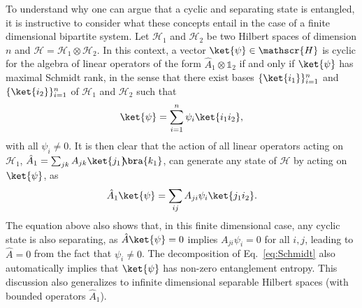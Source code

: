 \documentclass[letterpaper,12pt,titlepage,oneside,final]{book}
\newcommand{\openone}{\mathds{1}}
\begin{document}
To understand why one can argue that a cyclic and separating state is entangled, it is instructive to consider what these concepts entail in the case of a finite dimensional bipartite system. Let $\mathscr{H}_1$ and $\mathscr{H}_2$ be two Hilbert spaces of dimension $n$ and $\mathscr{H} = \mathscr{H}_1 \otimes \mathscr{H}_2$. In this context, a vector $\ket{\psi}\in\mathscr{H}$ is cyclic for the algebra of linear operators of the form $\hat{A}_1\otimes \openone_2$ if and only if $\ket{\psi}$ has maximal Schmidt rank, in the sense that there exist bases $\{\ket{i_1}\}_{i=1}^n$ and $\{\ket{i_2}\}_{i=1}^n$ of $\mathscr{H}_1$ and $\mathscr{H}_2$ such that
\begin{equation}\label{eq:Schmidt}
    \ket{\psi} = \sum_{i = 1}^n \psi_i\ket{i_1i_2},
\end{equation}
with all $\psi_i\neq0$. It is then clear that the action of all linear operators acting on $\mathscr{H}_1$, $\hat{A}_1 = \sum_{jk} A_{jk} \ket{j_1}\!\!\bra{k_1}$, can generate any state of $\mathscr{H}$ by acting on $\ket{\psi}$, as
\begin{equation}
    \hat{A}_1\ket{\psi} = \sum_{ij} A_{ji}\psi_i\ket{j_1i_2}.
\end{equation}
The equation above also shows that, in this finite dimensional case, any cyclic state is also separating, as $\hat{A}\ket{\psi} = 0$ implies $A_{ji}\psi_i = 0$ for all $i,j$, leading to $\hat{A} = 0$ from the fact that $\psi_i\neq 0$. The decomposition of Eq.~\eqref{eq:Schmidt} also automatically implies that $\ket{\psi}$ has non-zero entanglement entropy. This discussion also generalizes to infinite dimensional separable Hilbert spaces (with bounded operators $\hat{A}_1$).  
\end{document}
